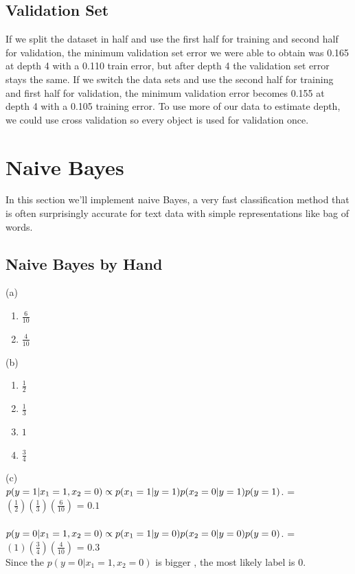 \documentclass{article}
\begin{document}
\subsection{Validation Set}

If we split the dataset in half and use the first half for training and second half for validation, the minimum validation set error we were able to obtain was 0.165 at depth 4 with a 0.110 train error, but after depth 4 the validation set error stays the same. If we switch the data sets and use the second half for training and first half for validation, the minimum validation error becomes 0.155 at depth 4 with a 0.105 training error. To use more of our data to estimate depth, we could use cross validation so every object is used for validation once.

\section{Naive Bayes}

In this section we'll implement naive Bayes, a very fast classification method that is often surprisingly accurate for text data with simple representations like bag of words.



\subsection{Naive Bayes by Hand}

(a)
\begin{enumerate}
\item  $\frac{6}{10}$
\item  $\frac{4}{10}$
\end{enumerate}

(b)
\begin{enumerate}
\item  $\frac{1}{2}$
\item  $\frac{1}{3}$
\item  $1$
\item  $\frac{3}{4}$
\end{enumerate}

(c)\\
$p( y = 1 |  x_1 = 1 , x_2 = 0 ) 
    \\ \propto p(  x_1 = 1  | y = 1 ) p(  x_2 = 0  | y = 1 ) p( y =1)$.
    \newline = $ (\frac{1}{2}) (\frac{1}{3})(\frac{6}{10}) $
    \newline = $0.1$
\\\\
$p( y = 0 |  x_1 = 1 , x_2 = 0 ) 
        \\\propto p(  x_1 = 1  | y = 0 ) p(  x_2 = 0  | y = 0 ) p( y =0)$.
        \newline =$ (1) (\frac{3}{4})(\frac{4}{10}) $
        \newline = $0.3$
\newline 
\\Since the $p( y = 0 |  x_1 = 1 , x_2 = 0 ) $ is bigger , the most likely label is 0.
\end{document}
